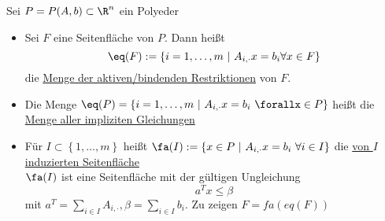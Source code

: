 \begin{definition}
	Sei $P = P(A,b) \subset \R^n$ ein Polyeder
	\begin{itemize}
		\item Sei $F$ eine Seitenfläche von $P$. Dann heißt 
			\begin{equation*}
				\eq(F):=\left\{ i = 1,\dots ,m\ |\ A_{i,\cdot}x = b_{i} \forall x \in F \right\}
			\end{equation*}
			die \underline{Menge der aktiven/bindenden Restriktionen} von $F$.
		\item Die Menge $\eq(P) = \left\{ i =1,\dots ,m \ |\ A_{i,\cdot}x =b_{i} \ \forallx \in P \right\}$ heißt die \underline{Menge aller impliziten Gleichungen}
		\item Für $I \subset  \left\{ 1,\dots ,m \right\}$ heißt $\fa(I):=\left\{x \in P \ |\ A_{i,\cdot}x = b_{i} \ \forall i \in I \right\}$ die \underline{von $I$ induzierten Seitenfläche}\\
			$\fa(I)$ ist eine Seitenfläche mit der gültigen Ungleichung 
			\begin{equation*}
				a^{T} x \leq \beta
			\end{equation*}
			mit $a^{T} = \sum_{i \in I}^{} A_{i,\cdot}, \beta = \sum_{i \in I}^{} b_{i}$. Zu zeigen $F = fa(eq(F))$
	\end{itemize}
	
\end{definition}


